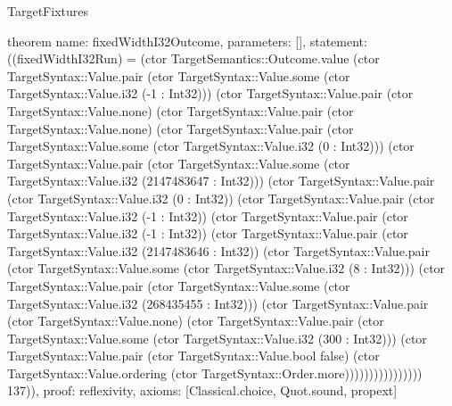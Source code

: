 \begin{lexlean}{TargetFixtures}
\begin{semanticmodule}
theorem{
  name: fixedWidthI32Outcome,
  parameters: [],
  statement: ((fixedWidthI32Run) = (ctor TargetSemantics::Outcome.value (ctor TargetSyntax::Value.pair (ctor TargetSyntax::Value.some (ctor TargetSyntax::Value.i32 (-1 : Int32))) (ctor TargetSyntax::Value.pair (ctor TargetSyntax::Value.none) (ctor TargetSyntax::Value.pair (ctor TargetSyntax::Value.none) (ctor TargetSyntax::Value.pair (ctor TargetSyntax::Value.some (ctor TargetSyntax::Value.i32 (0 : Int32))) (ctor TargetSyntax::Value.pair (ctor TargetSyntax::Value.some (ctor TargetSyntax::Value.i32 (2147483647 : Int32))) (ctor TargetSyntax::Value.pair (ctor TargetSyntax::Value.i32 (0 : Int32)) (ctor TargetSyntax::Value.pair (ctor TargetSyntax::Value.i32 (-1 : Int32)) (ctor TargetSyntax::Value.pair (ctor TargetSyntax::Value.i32 (-1 : Int32)) (ctor TargetSyntax::Value.pair (ctor TargetSyntax::Value.i32 (2147483646 : Int32)) (ctor TargetSyntax::Value.pair (ctor TargetSyntax::Value.some (ctor TargetSyntax::Value.i32 (8 : Int32))) (ctor TargetSyntax::Value.pair (ctor TargetSyntax::Value.some (ctor TargetSyntax::Value.i32 (268435455 : Int32))) (ctor TargetSyntax::Value.pair (ctor TargetSyntax::Value.none) (ctor TargetSyntax::Value.pair (ctor TargetSyntax::Value.some (ctor TargetSyntax::Value.i32 (300 : Int32))) (ctor TargetSyntax::Value.pair (ctor TargetSyntax::Value.bool false) (ctor TargetSyntax::Value.ordering (ctor TargetSyntax::Order.more)))))))))))))))) 137)),
  proof: reflexivity{},
  axioms: [Classical.choice, Quot.sound, propext]
}


\end{semanticmodule}
\end{lexlean}
